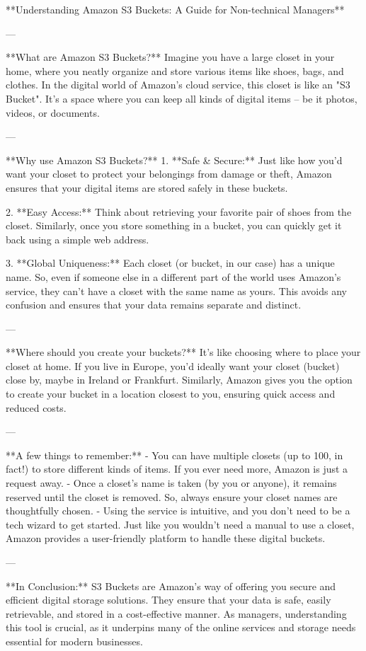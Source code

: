 **Understanding Amazon S3 Buckets: A Guide for Non-technical Managers**

---

**What are Amazon S3 Buckets?**
Imagine you have a large closet in your home, where you neatly organize and store various items like shoes, bags, and clothes. In the digital world of Amazon's cloud service, this closet is like an "S3 Bucket". It's a space where you can keep all kinds of digital items – be it photos, videos, or documents.

---

**Why use Amazon S3 Buckets?**
1. **Safe & Secure:** Just like how you'd want your closet to protect your belongings from damage or theft, Amazon ensures that your digital items are stored safely in these buckets.
   
2. **Easy Access:** Think about retrieving your favorite pair of shoes from the closet. Similarly, once you store something in a bucket, you can quickly get it back using a simple web address.
    
3. **Global Uniqueness:** Each closet (or bucket, in our case) has a unique name. So, even if someone else in a different part of the world uses Amazon's service, they can't have a closet with the same name as yours. This avoids any confusion and ensures that your data remains separate and distinct.

---

**Where should you create your buckets?**
It's like choosing where to place your closet at home. If you live in Europe, you'd ideally want your closet (bucket) close by, maybe in Ireland or Frankfurt. Similarly, Amazon gives you the option to create your bucket in a location closest to you, ensuring quick access and reduced costs.

---

**A few things to remember:**
- You can have multiple closets (up to 100, in fact!) to store different kinds of items. If you ever need more, Amazon is just a request away.
- Once a closet's name is taken (by you or anyone), it remains reserved until the closet is removed. So, always ensure your closet names are thoughtfully chosen.
- Using the service is intuitive, and you don’t need to be a tech wizard to get started. Just like you wouldn't need a manual to use a closet, Amazon provides a user-friendly platform to handle these digital buckets.

---

**In Conclusion:**
S3 Buckets are Amazon's way of offering you secure and efficient digital storage solutions. They ensure that your data is safe, easily retrievable, and stored in a cost-effective manner. As managers, understanding this tool is crucial, as it underpins many of the online services and storage needs essential for modern businesses.